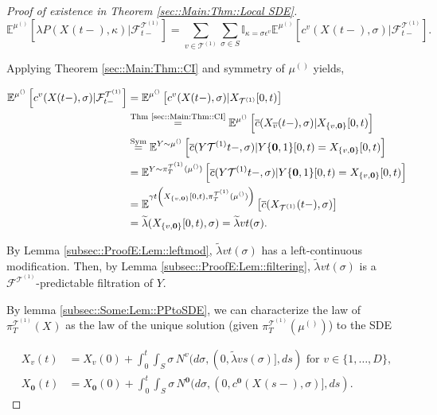 \documentclass[12pt]{article}
\newcommand{\mb}{\mathbb}
\newcommand{\mc}{\mathcal}
\newcommand{\ov}{\overline}
\newcommand{\os}{\overset}
\newcommand{\te}{\text}
\newcommand{\ep}{\epsilon}
\newcommand{\ind}{\hspace{24pt}}
\newcommand{\exmu}[2]{\mb{E}^{#1}\left[#2\right]}	%
\renewcommand{\root}{\mathbf{0}}				%
\renewcommand{\v}{v}							%
\renewcommand{\S}{S}							%
\newcommand{\s}{\sigma}							%
\newcommand{\ev}{\ep}							%
\newcommand{\T}{T}								%
\renewcommand{\t}{t}							%
\newcommand{\proj}{\pi}							%
\renewcommand{\tt}{s}							%
\newcommand{\F}{\mc{F}}							%
\newcommand{\X}{X}								%
\newcommand{\IGr}{c}							%
\newcommand{\vind}[1]{^{#1}}					%
\newcommand{\vsi}[1]{^{#1}}						%
\newcommand{\cind}[1]{_{#1}}					%
\newcommand{\cl}{\ov}							%
\newcommand{\tp}[1]{(#1)}						%
\newcommand{\tip}[1]{#1}						%
\newcommand{\ts}[1]{_{#1}}						%
\newcommand{\degr}{D}							%
\newcommand{\IGrg}{\ov{c}}						%
\newcommand{\tree}{\mc{T}}						%
\newcommand{\sln}[1]{^{(#1)}}						%
\newcommand{\poiss}{N}							%
\newcommand{\rate}{\lambda}						%
\newcommand{\alt}[1]{\widetilde{#1}}			%
\newcommand{\m}{\mu}							%
\newcommand{\cm}{\gamma}						%
\newcommand{\XX}{Y}								%
\renewcommand{\mark}{\kappa}					%
\newcommand{\rp}{P}								%
\newcommand{\crate}{\alt{\lambda}}				%
\begin{document}
\begin{proof}[Proof of existence in Theorem \ref{sec::Main:Thm::Local SDE}]
\[\exmu{\m\sln{}\ts{}}{\rate{\rp{}}(\X\cind{}\tp{\t-},\mark{})|\F\vsi{\tree\sln{1}}\ts{\t-}} = \sum_{\v \in \tree\sln{1}}\sum_{\s\in \S} \mb{I}_{\mark{} = \s\ev\vind{\v}}\exmu{\m\sln{}\ts{}}{\IGr\vind{\v}(\X\cind{}\tp{\t-},\s)|\F\vsi{\tree\sln{1}}\ts{\t-}}.\]

Applying Theorem \ref{sec::Main:Thm::CI} and symmetry of \(\m\sln{}\ts{}\) yields,

\begin{align*}
\exmu{\m\sln{}\ts{}}{\IGr\vind{\v}(\X\cind{}\tp{\t-},\s)|\F\vsi{\tree\sln{1}}\ts{\t-}} &= \exmu{\m\sln{}\ts{}}{\IGr\vind{\v}(\X\cind{}\tp{\t-},\s)|\X\cind{\tree\sln{1}}\tip{[0,\t)}}\\
&\os{\te{Thm \ref{sec::Main:Thm::CI}}}{=} \exmu{\m\sln{}\ts{}}{\IGrg{}(\X\cind{\cl{\v}}\tp{\t-},\s)|\X\cind{\{\v,\root\}}\tip{[0,\t)}} \\
&\os{\te{Sym}}{=} \exmu{\XX{}{}\sim \m\sln{}\ts{}}{\IGrg{}(\XX{\tree\sln{1}}{\t-},\s)|\XX{\{\root,1\}}{[0,\t)} = \X\cind{\{\v,\root\}}\tip{[0,\t)}}\\
&= \exmu{\XX{}{}\sim \proj\vsi{\tree\sln{1}}\ts{\T}(\m\sln{}\ts{})}{\IGrg{}(\XX{\tree\sln{1}}{\t-},\s)|\XX{\{\root,1\}}{[0,\t)} = \X\cind{\{\v,\root\}}\tip{[0,\t)}}\\
&= \exmu{\cm{\t}\left(\X\cind{\{\v,\root\}}\tip{[0,\t)},\proj\vsi{\tree\sln{1}}\ts{\T}(\m\sln{}\ts{})\right)}{\IGrg{}(\X\cind{\tree\sln{1}}\tp{\t-},\s)}\\
&=\crate{}{}(\X\cind{\{\v,\root\}}\tip{[0,\t)},\s) = \crate{\v}{\t}(\s).
\end{align*}

By Lemma \ref{subsec::ProofE:Lem::leftmod}, \(\crate{\v}{\t}(\s)\) has a left-continuous modification. Then, by Lemma \ref{subsec::ProofE:Lem::filtering}, \(\crate{\v}{\t}(\s)\) is a \(\F\vsi{\tree\sln{1}}\ts{}\)-predictable filtration of \(\XX{}{}\).

\ind By lemma \ref{subsec::Some:Lem::PPtoSDE}, we can characterize the law of \(\proj\vsi{\tree\sln{1}}\ts{\T}(\X\cind{}\tip{})\) as the law of the unique solution (given \(\proj\vsi{\tree\sln{1}}\ts{\T}(\m\sln{}\ts{})\)) to the SDE

\begin{align*}
\X\cind{\v}\tp{\t} &= \X\cind{\v}\tp{0} + \int_0^\t\int_\S \s\,\poiss\vind{\v}(d\s,(0,\crate{\v}{\tt}(\s)],d\tt) \te{ for } \v \in \{1,\dots,\degr\},\\
\X\cind{\root}\tp{\t} &= \X\cind{\root}\tp{0} + \int_0^\t\int_\S \s\,\poiss\vind{\root}(d\s,(0,\IGr\vind{\root}(\X\cind{}\tp{\tt-},\s)],d\tt).
\end{align*}
\end{proof}
\end{document}
